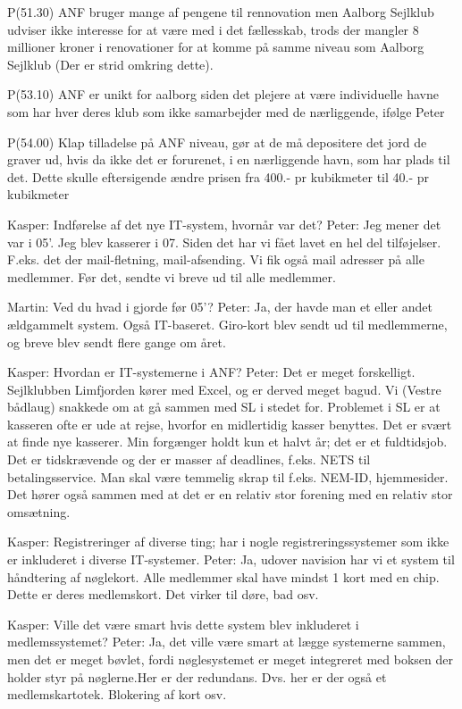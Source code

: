 P(51.30) ANF bruger mange af pengene til rennovation men Aalborg Sejlklub 
udviser ikke interesse for at være med i det fællesskab, trods der mangler
8 millioner kroner i renovationer for at komme på samme niveau som
Aalborg Sejlklub (Der er strid omkring dette).

P(53.10) ANF er unikt for aalborg siden det plejere at være individuelle havne
som har hver deres klub som ikke samarbejder med de nærliggende, ifølge Peter

P(54.00) Klap tilladelse på ANF niveau, gør at de må depositere det jord de graver ud,
hvis da ikke det er forurenet, i en nærliggende havn, som har plads til det.
Dette skulle eftersigende ændre prisen fra 400.- pr kubikmeter til 40.- pr kubikmeter

Kasper: Indførelse af det nye IT-system, hvornår var det?
Peter: Jeg mener det var i 05'. Jeg blev kasserer i 07. Siden det har vi fået lavet en hel del tilføjelser. F.eks. det der mail-fletning, mail-afsending. Vi fik også mail adresser på alle medlemmer. Før det, sendte vi breve ud til alle medlemmer.

Martin: Ved du hvad i gjorde før 05'?
Peter: Ja, der havde man et eller andet ældgammelt system. Også IT-baseret. Giro-kort blev sendt ud til medlemmerne, og breve blev sendt flere gange om året.

Kasper: Hvordan er IT-systemerne i ANF?
Peter: Det er meget forskelligt. Sejlklubben Limfjorden kører med Excel, og er derved meget bagud. Vi (Vestre bådlaug) snakkede om at gå sammen med SL i stedet for. Problemet i SL er at kasseren ofte er ude at rejse, hvorfor en midlertidig kasser benyttes. Det er svært at finde nye kasserer. Min forgænger holdt kun et halvt år; det er et fuldtidsjob. Det er tidskrævende og der er masser af deadlines, f.eks. NETS til betalingsservice. Man skal være temmelig skrap til f.eks. NEM-ID, hjemmesider. Det hører også sammen med at det er en relativ stor forening med en relativ stor omsætning.

Kasper: Registreringer af diverse ting; har i nogle registreringssystemer som ikke er inkluderet i diverse IT-systemer.
Peter: Ja, udover navision har vi et system til håndtering af nøglekort. Alle medlemmer skal have mindst 1 kort med en chip. Dette er deres medlemskort. Det virker til døre, bad osv.

Kasper: Ville det være smart hvis dette system blev inkluderet i medlemssystemet?
Peter: Ja, det ville være smart at lægge systemerne sammen, men det er meget bøvlet, fordi nøglesystemet er meget integreret med boksen der holder styr på nøglerne.Her er der redundans. Dvs. her er der også et medlemskartotek. Blokering af kort osv. 

